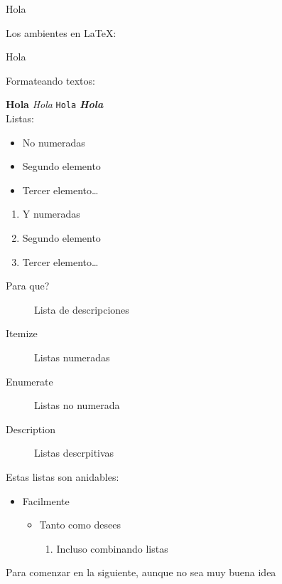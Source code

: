 \documentclass[12pt,letterpaper]{article}
\begin{document}
Hola

Los ambientes en \LaTeX:

\begin{center}
  Hola
\end{center}

Formateando textos:

\textbf{Hola} \textit{Hola} \texttt{Hola} \textbf{\textit{Hola}}
\\                              %
Listas:
\begin{itemize}
  \item No numeradas
  \item Segundo elemento
  \item Tercer elemento\ldots
\end{itemize}

\begin{enumerate}
  \item Y numeradas
  \item Segundo elemento
  \item Tercer elemento\ldots
\end{enumerate}

\begin{description}
  \item[Para que?] Lista de descripciones
  \item[Itemize] Listas numeradas
  \item[Enumerate] Listas no numerada
  \item[Description] Listas descrpitivas
\end{description}

Estas listas son anidables:
\begin{itemize}
  \item Facilmente
  \begin{itemize}
    \item Tanto como desees
    \begin{enumerate}
      \item Incluso combinando listas
    \end{enumerate}
  \end{itemize}
\end{itemize}

\clearpage
Para comenzar en la siguiente, aunque no sea muy buena idea
\end{document}

